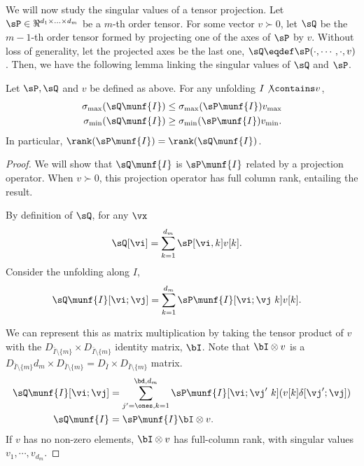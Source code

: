 We will now study the singular values of a tensor projection. 
Let $\sP \in \Re^{d_1 \times \ldots \times d_m}$ be a $m$-th order
  tensor. 
For some vector $v \succ 0$, let $\sQ$ be the $m-1$-th order tensor
  formed by projecting one of the axes of $\sP$ by $v$. 
Without loss of generality, let the projected axes be the last one, $\sQ
  \eqdef \sP(\cdot, \cdots, \cdot, v)$.
Then, we have the following lemma linking the singular values of $\sQ$
  and $\sP$.
\begin{lemma}
  \label{lem:tensor-projection}
  Let $\sP, \sQ$ and $v$ be defined as above. For any unfolding $I
  \not\contains v$, 
\begin{align*}
  \sigma_{\max}(\sQ\munf{I}) &\le \sigma_{\max}(\sP\munf{I}) v_{\max} \\
  \sigma_{\min}(\sQ\munf{I}) &\ge \sigma_{\min}(\sP\munf{I}) v_{\min}.
\end{align*}
In particular, $\rank(\sP\munf{I}) = \rank(\sQ\munf{I})$.
\end{lemma}
\begin{proof}
  We will show that $\sQ\munf{I}$ is $\sP\munf{I}$ related by
  a projection operator. When $v \succ 0$, this projection operator has
  full column rank, entailing the result.

  By definition of $\sQ$, for any $\vx$
  \begin{align*}
    \sQ[\vi] &= \sum_{k=1}^{d_m} \sP[\vi, k] v[k].
  \end{align*}
  Consider the unfolding along $I$,
  \begin{align*}
    \sQ\munf{I}[\vi;\vj] &= \sum_{k=1}^{d_m} \sP\munf{I}[\vi;\vj\ k] v[k].
  \end{align*}

  We can represent this as matrix multiplication by taking the tensor
  product of $v$ with the $D_{\bar I \setminus \{m\}} \times D_{\bar
  I \setminus \{m\}}$ identity matrix, $\bI$. Note that $\bI \otimes v$ is a $
  D_{\bar I \setminus \{m\}} d_m \times D_{\bar I \setminus \{m\}}
  = D_{\bar I } \times D_{\bar I \setminus \{m\}}$ matrix.
  \begin{align*}
    \sQ\munf{I}[\vi;\vj] 
      &= \sum_{j'=\ones, k=1}^{\bd, d_m} \sP\munf{I}[\vi;\vj'\ k] (v[k] \delta[\vj';\vj]) \\
    \sQ\munf{I}
      &= \sP\munf{I} \bI \otimes v.
  \end{align*}
  If $v$ has no non-zero elements, $\bI \otimes v$ has full-column
  rank, with singular values $v_1, \cdots, v_{d_m}$.
\end{proof}


